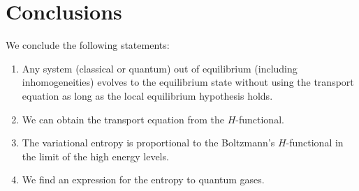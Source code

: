 \section{Conclusions}\label{sec:conclusions}
We conclude the following statements:\\
\begin{enumerate}
    \item Any system (classical or quantum) out of equilibrium (including inhomogeneities) evolves to the equilibrium state without using the transport equation as long as the local equilibrium hypothesis holds.
    \item We can obtain the transport equation from the $H$-functional.
    \item The variational entropy is proportional to the Boltzmann's $H$-functional in the limit of the high energy levels.
    \item We find an expression for the entropy to quantum gases.
    \end{enumerate}
  
  
\clearpage



